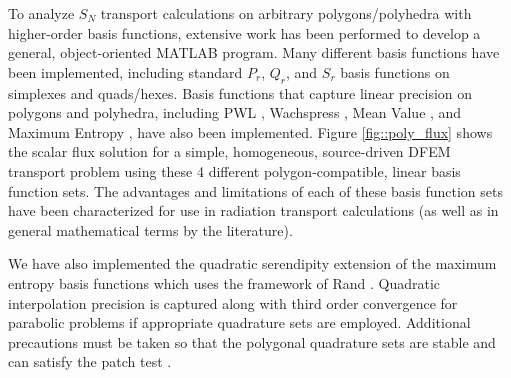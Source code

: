\documentclass[11pt]{article}
\begin{document}
To analyze $S_N$ transport calculations on arbitrary polygons/polyhedra with higher-order basis functions, extensive work has been performed to develop a general, object-oriented MATLAB program. Many different basis functions have been implemented, including standard $P_r$, $Q_r$, and $S_r$ basis functions on simplexes and quads/hexes. Basis functions that capture linear precision on polygons and polyhedra, including PWL \cite{ref::PWLD_stone_adams,ref::PWLD_stone_adams_unstructured,bailey2008phd,bailey2011piecewise}, Wachspress \cite{wachspress1975rational}, Mean Value \cite{floater2003mean,floater2005mean,hormann2006mean}, and Maximum Entropy \cite{sukumar2004construction,sukumar2005maximum,hormann2008maximum}, have also been implemented. Figure \ref{fig::poly_flux} shows the scalar flux solution for a simple, homogeneous, source-driven DFEM transport problem using these 4 different polygon-compatible, linear basis function sets. The advantages and limitations of each of these basis function sets have been characterized for use in radiation transport calculations (as well as in general mathematical terms by the literature). 

We have also implemented the quadratic serendipity extension of the maximum entropy basis functions \cite{sukumar2013quadratic} which uses the framework of Rand \cite{rand2014quadratic}. Quadratic interpolation precision is captured along with third order convergence for parabolic problems if appropriate quadrature sets are employed. Additional precautions must be taken so that the polygonal quadrature sets are stable and can satisfy the patch test \cite{sukumar2013quadratic,dunavant1985high,krongauz1997consistent,puso2008meshfree,duan2012second}. 
\end{document}
